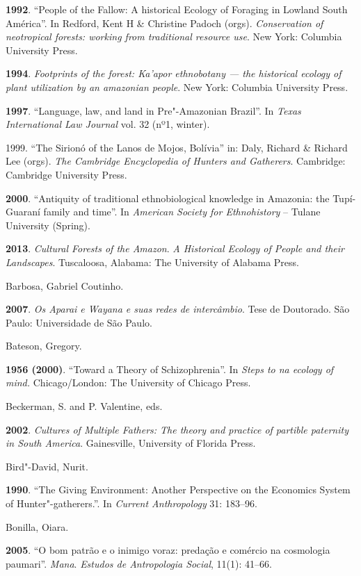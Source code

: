 \textbf{1992}. ``People of the Fallow: A historical Ecology of Foraging
in Lowland South América''. In Redford, Kent H \& Christine Padoch
(orgs). \emph{Conservation of neotropical forests: working from
traditional resource use}. New York: Columbia University Press.

\textbf{1994}. \emph{Footprints of the forest: Ka'apor ethnobotany ---
the historical ecology of plant utilization by an amazonian people}. New
York: Columbia University Press.

\textbf{1997}. ``Language, law, and land in Pre"-Amazonian Brazil''. In
\emph{Texas International Law Journal} vol. 32 (nº1, winter).

1999. ``The Sirionó of the Lanos de Mojos, Bolívia'' in: Daly, Richard
\& Richard Lee (orgs). \emph{The Cambridge Encyclopedia of Hunters and
Gatherers}. Cambridge: Cambridge University Press.

\textbf{2000}. ``Antiquity of traditional ethnobiological knowledge in
Amazonia: the Tupí-Guaraní family and time''. In \emph{American Society
for Ethnohistory} -- Tulane University (Spring).

\textbf{2013}. \emph{Cultural Forests of the Amazon}. \emph{A Historical
Ecology of People and their Landscapes}. Tuscaloosa, Alabama: The
University of Alabama Press. 

Barbosa, Gabriel Coutinho.

\textbf{2007}. \emph{Os Aparai e Wayana e suas redes de intercâmbio}.
Tese de Doutorado. São Paulo: Universidade de São Paulo.

Bateson, Gregory.

\textbf{1956 (2000)}. ``Toward a Theory of Schizophrenia''. In
\emph{Steps to na ecology of mind.} Chicago/London: The University of
Chicago Press.

Beckerman, S. and P. Valentine, eds.

\textbf{2002}. \emph{Cultures of Multiple Fathers: The theory and
practice of partible paternity in South America}. Gainesville,
University of Florida Press.

Bird"-David, Nurit.

\textbf{1990}. ``The Giving Environment: Another Perspective on the
Economics System of Hunter"-gatherers.''. In \emph{Current Anthropology}
31: 183--96.

Bonilla, Oiara.

\textbf{2005}. ``O bom patrão e o inimigo voraz: predação e comércio na
cosmologia paumari''. \emph{Mana}. \emph{Estudos de Antropologia
Social}, 11(1): 41--66.

